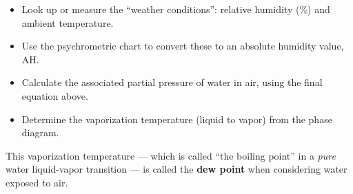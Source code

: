 \documentclass[12pt]{article}
\begin{document}
	\begin{itemize}
	\item Look up or measure the ``weather conditions'': relative humidity (\%) and ambient temperature.
	\item Use the psychrometric chart to convert these to an absolute humidity value, AH.
	\item Calculate the associated partial pressure of water in air, using the final equation above.
	\item Determine the vaporization temperature (liquid to vapor) from the phase diagram.
	\end{itemize}
This vaporization temperature --- which is called ``the boiling point'' in a {\em pure} water liquid-vapor transition --- is called the {\bf dew point} when considering water exposed to air.


\newpage
\end{document}
